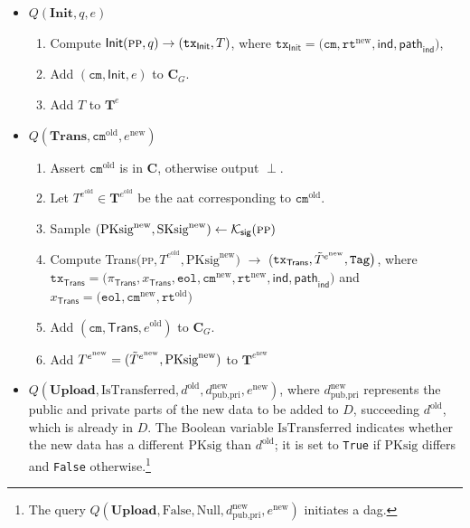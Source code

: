 \begin{itemize}
	\item $Q(\textbf{Init}, q, e)$ 
	\begin{enumerate}
		\item Compute $\textsf{Init}(\textsc{pp}, q) \rightarrow (\texttt{tx}_\textsf{Init}, T)$, where $\texttt{tx}_\textsf{Init} = \big(\texttt{cm}, \texttt{rt}^{\text{new}}, \mathsf{ind}, \mathsf{path}_{\mathsf{ind}}\big)$,
		\item  Add $(\texttt{cm}, \textsf{Init}, e)$ to $\mathbf{C}_G$.
		\item Add $T$ to $\mathbf{T}^e$
	\end{enumerate}


	\item $Q(\textbf{Trans}, \texttt{cm}^\text{old}, e^\text{new})$ 
	\begin{enumerate}
		\item Assert $\texttt{cm}^\text{old}$ is in $\mathbf{C}$, otherwise output $\perp$.
		\item Let $T^{e^\text{old}} \in \mathbf{T}^{e^\text{old}}$ be the \gls{aat} corresponding to $\texttt{cm}^\text{old}$.
		\item Sample $ (\text{PKsig}^\text{new}, \text{SKsig}^\text{new})  \leftarrow {\mathcal{K}_\mathsf{sig}} (\textsc{pp})$
		\item \sloppy Compute \textsf{Trans}$\big($\textsc{pp}$, T^{e^\text{old}},  \text{PKsig}^\text{new} \big)$ $\rightarrow$ \big($\texttt{tx}_{\textsf{Trans}}, \Tilde{T}^{e^\text{new}}, \texttt{Tag}\big)$, where $\texttt{tx}_{\textsf{Trans}} = \big(\pi_{\textsf{Trans}}, x_{\textsf{Trans}}, \texttt{eol}, \texttt{cm}^{\text{new}}, \texttt{rt}^{\text{new}}, \mathsf{ind}, \mathsf{path}_{\mathsf{ind}} \big)$ and $x_\textsf{Trans} = \big(\texttt{eol}, \texttt{cm}^{\text{new}}, \texttt{rt}^{\text{old}}\big)$
		\item  Add $(\texttt{cm}, \textsf{Trans}, e^\text{old})$ to $\mathbf{C}_G$.
		\item Add $T^{e^\text{new}} = (\Tilde{T}^{e^\text{new}},  \text{PKsig}^\text{new})$ to $\mathbf{T}^{e^{\text{new}}}$
	\end{enumerate}
	
	\item $Q(\textbf{Upload}, \text{IsTransferred}, d^\text{old}, d_{\text{pub}, \text{pri}}^\text{new},  e^\text{new})$, where $d_{\text{pub}, \text{pri}}^\text{new}$ represents the public and private parts of the new data to be added to $D$, succeeding $d^\text{old}$, which is already in $D$. The Boolean variable $\text{IsTransferred}$ indicates whether the new data has a different $\text{PKsig}$ than $d^\text{old}$; it is set to \texttt{True} if $\text{PKsig}$ differs and \texttt{False} otherwise.\footnote{The query $Q(\textbf{Upload}, \text{False}, \text{Null}, d_{\text{pub}, \text{pri}}^\text{new},  e^\text{new})$ initiates a \gls{dag}.}
	

\end{itemize}

